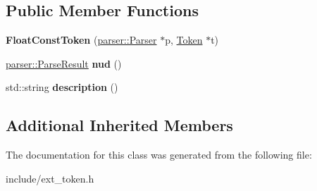 \subsection*{Public Member Functions}
\begin{DoxyCompactItemize}
\item 
{\bfseries Float\+Const\+Token} (\hyperlink{classfcal_1_1parser_1_1Parser}{parser\+::\+Parser} $\ast$p, \hyperlink{classfcal_1_1scanner_1_1Token}{Token} $\ast$t)\hypertarget{classfcal_1_1scanner_1_1FloatConstToken_a715ecedd2f42b7fbcfbf564dad7909fc}{}\label{classfcal_1_1scanner_1_1FloatConstToken_a715ecedd2f42b7fbcfbf564dad7909fc}

\item 
\hyperlink{classfcal_1_1parser_1_1ParseResult}{parser\+::\+Parse\+Result} {\bfseries nud} ()\hypertarget{classfcal_1_1scanner_1_1FloatConstToken_a7ceca1dc6b064daf39e7250d8d93a9ce}{}\label{classfcal_1_1scanner_1_1FloatConstToken_a7ceca1dc6b064daf39e7250d8d93a9ce}

\item 
std\+::string {\bfseries description} ()\hypertarget{classfcal_1_1scanner_1_1FloatConstToken_ac98711e11205722a389fc19682183286}{}\label{classfcal_1_1scanner_1_1FloatConstToken_ac98711e11205722a389fc19682183286}

\end{DoxyCompactItemize}
\subsection*{Additional Inherited Members}


The documentation for this class was generated from the following file\+:\begin{DoxyCompactItemize}
\item 
include/ext\+\_\+token.\+h\end{DoxyCompactItemize}
